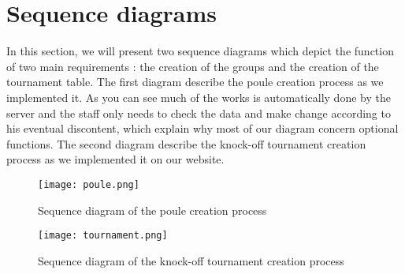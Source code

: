 \section{Sequence diagrams}
\label{Sequence diagrams}

In this section, we will present two sequence diagrams which depict the function of two main requirements : the creation of the groups and the creation of the tournament table. \newline
The first diagram describe the poule creation process as we implemented it. As you can see much of the works is automatically done by the server and the staff only needs to check the data and make change according to his eventual discontent, which explain why most of our diagram concern optional functions. \newline
The second diagram describe the knock-off tournament creation process as we implemented it on our website. \newline

\begin{figure}[!ht]
	\centering
	\texttt{[image: poule.png]}
	\caption{Sequence diagram of the poule creation process}
	\label{fig:length_eight_mouse}
\end{figure}
\FloatBarrier

\begin{figure}[!ht]
	\centering
	\texttt{[image: tournament.png]}
	\caption{Sequence diagram of the knock-off tournament creation process}
	\label{fig:length_eight_mouse}
\end{figure}
\FloatBarrier